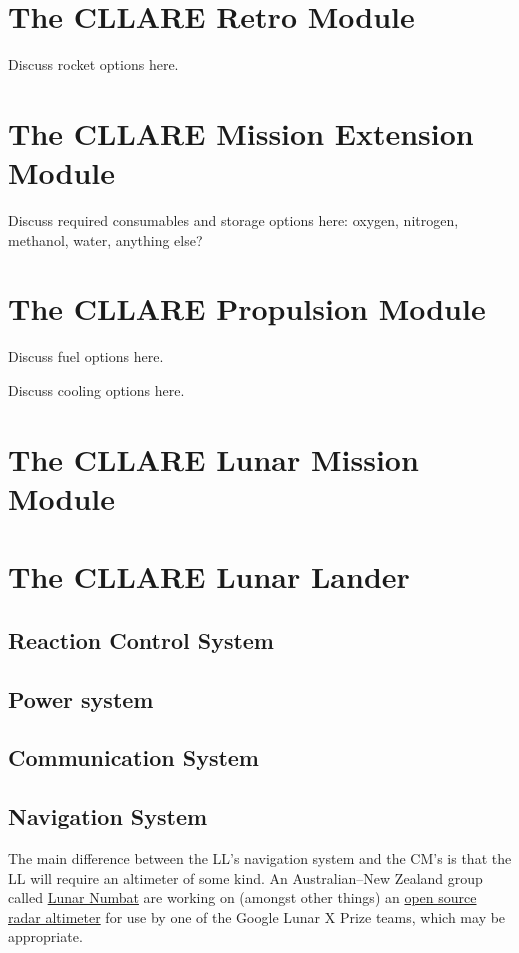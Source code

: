 \documentclass{report}
\begin{document}
\section{The CLLARE Retro Module}

Discuss rocket options here.

\section{The CLLARE Mission Extension Module}

Discuss required consumables and storage options here: oxygen, nitrogen, methanol, water, anything else?

\section{The CLLARE Propulsion Module}

Discuss fuel options here.

Discuss cooling options here.

\section{The CLLARE Lunar Mission Module}

\section{The CLLARE Lunar Lander}

\subsection{Reaction Control System}
\subsection{Power system}
\subsection{Communication System}
\subsection{Navigation System}

The main difference between the LL's navigation system and the CM's is that the LL will require an altimeter of some kind.  An Australian--New Zealand group called \href{http://www.lunarnumbat.org}{Lunar Numbat} are working on (amongst other things) an \href{http://www.lunarnumbat.org/cgi-bin/twiki/view/LunarNumbat/LNTaskRadarAltimeter}{open source radar altimeter} for use by one of the Google Lunar X Prize teams, which may be appropriate.
\end{document}
